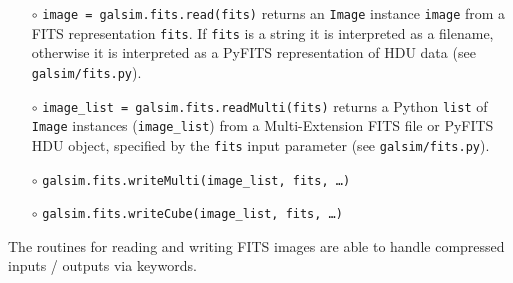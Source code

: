\documentclass[preprint,11pt]{../../devel/modules/aastex}
\begin{document}
\begin{itemize}

\item[$\circ$] \texttt{image = galsim.fits.read(fits)} \newline
{returns an \texttt{Image} instance \texttt{image} from a FITS
  representation \texttt{fits}.  If \texttt{fits} is a string it is
  interpreted as a filename, otherwise it is interpreted as a PyFITS
  representation of HDU data (see
  \texttt{galsim/fits.py}).}
\item[$\circ$] \texttt{image\_list = galsim.fits.readMulti(fits)}
  \newline
{returns a Python \texttt{list} of \texttt{Image} instances (\texttt{image\_list}) from a
Multi-Extension FITS file or PyFITS HDU object, specified by the
\texttt{fits} input parameter (see \texttt{galsim/fits.py}).}
\item[$\circ$] \texttt{galsim.fits.writeMulti(image\_list, fits, \dots)}
\item[$\circ$] \texttt{galsim.fits.writeCube(image\_list, fits, \dots)}

\end{itemize}

The routines for reading and writing FITS images are able to handle
compressed inputs / outputs via keywords.
\end{document}
